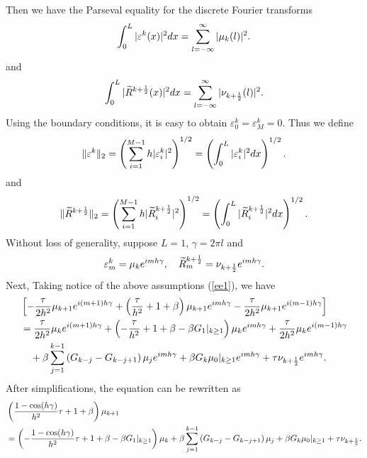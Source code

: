 \documentclass[3p,times]{elsarticle}
\begin{document}
Then we have the Parseval equality for the discrete Fourier transforms
\begin{equation*}
\aligned
\int_0^L|\varepsilon^k(x)|^2dx=\sum\limits_{l=-\infty}^{\infty}|\mu_k(l)|^2.
\endaligned
\end{equation*}
and
\begin{equation}\label{Pe1}
\aligned
\int_0^L|\widetilde{R}^{k+\frac{1}{2}}(x)|^2dx=\sum\limits_{l=-\infty}^{\infty}|\nu_{k+\frac{1}{2}}(l)|^2.
\endaligned
\end{equation}
Using the boundary conditions, it is easy to obtain $\varepsilon_0^k=\varepsilon_M^k=0$. Thus we define
\begin{equation*}
\aligned
\|\varepsilon^k\|_2=\left(\sum\limits_{i=1}^{M-1}h|\varepsilon^k_i|^2\right)^{1/2}=\left(\int_0^L|\varepsilon_i^k|^2dx\right)^{1/2}.
\endaligned
\end{equation*}
and
\begin{equation*}
\aligned
\|\widetilde{R}^{k+\frac{1}{2}}\|_2=\left(\sum\limits_{i=1}^{M-1}h|\widetilde{R}^{k+\frac{1}{2}}_i|^2\right)^{1/2}=\left(\int_0^L|\widetilde{R}_i^{k+\frac{1}{2}}|^2dx\right)^{1/2}.
\endaligned
\end{equation*}
Without loss of generality, suppose $L=1$, $\gamma=2\pi l$ and
\begin{equation}\label{ee1}
\aligned
\varepsilon_m^k=\mu_ke^{imh\gamma},\quad\widetilde{R}_m^{k+\frac{1}{2}}=\nu_{k+\frac{1}{2}}e^{imh\gamma}.
\endaligned
\end{equation}
Next, Taking notice of the above assumptions (\ref{ee1}), we have
\begin{equation}\label{e33}
\aligned
&\left[-\frac{\tau}{2h^2}\mu_{k+1}e^{i(m+1)h\gamma}+\left(\frac{\tau}{h^2}+1+\beta\right)\mu_{k+1}e^{imh\gamma}-\frac{\tau}{2h^2}\mu_{k+1}e^{i(m-1)h\gamma}\right]\\
&=\frac{\tau}{2h^2}\mu_{k}e^{i(m+1)h\gamma}+\left(-\frac{\tau}{h^2}+1+\beta-\beta G_1|_{k\geq1}\right)\mu_{k}e^{imh\gamma}+\frac{\tau}{2h^2}\mu_{k}e^{i(m-1)h\gamma}\\
&\quad+\beta\sum\limits_{j=1}^{k-1}\left(G_{k-j}-G_{k-j+1}\right)\mu_je^{imh\gamma}+\beta G_k\mu_0|_{k\geq1}e^{imh\gamma}+\tau\nu_{k+\frac{1}{2}}e^{imh\gamma}.
\endaligned
\end{equation}
After simplifications, the equation can be rewritten as
\begin{equation}\label{e34}
\aligned
&\left(\frac{1-\cos(h\gamma)}{h^2}\tau+1+\beta\right)\mu_{k+1}\\
&=\left(-\frac{1-\cos(h\gamma)}{h^2}\tau+1+\beta-\beta G_1|_{k\geq1}\right)\mu_k+\beta\sum\limits_{j=1}^{k-1}\left(G_{k-j}-G_{k-j+1}\right)\mu_j+\beta G_k\mu_0|_{k\geq1}+\tau\nu_{k+\frac{1}{2}}.
\endaligned
\end{equation}
\end{document}
